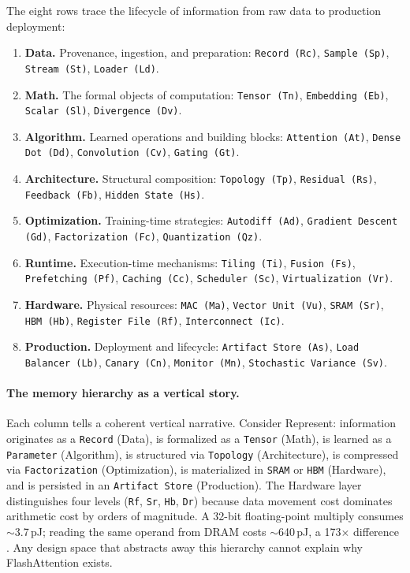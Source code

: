 \documentclass[10pt,twocolumn]{article}
\begin{document}
The eight rows trace the lifecycle of information from raw data to production deployment:

\begin{enumerate}[nosep, leftmargin=*]
\item \textbf{Data.} Provenance, ingestion, and preparation: \texttt{Record (Rc)}, \texttt{Sample (Sp)}, \texttt{Stream (St)}, \texttt{Loader (Ld)}.
\item \textbf{Math.} The formal objects of computation: \texttt{Tensor (Tn)}, \texttt{Embedding (Eb)}, \texttt{Scalar (Sl)}, \texttt{Divergence (Dv)}.
\item \textbf{Algorithm.} Learned operations and building blocks: \texttt{Attention (At)}, \texttt{Dense Dot (Dd)}, \texttt{Convolution (Cv)}, \texttt{Gating (Gt)}.
\item \textbf{Architecture.} Structural composition: \texttt{Topology (Tp)}, \texttt{Residual (Rs)}, \texttt{Feedback (Fb)}, \texttt{Hidden State (Hs)}.
\item \textbf{Optimization.} Training-time strategies: \texttt{Autodiff (Ad)}, \texttt{Gradient Descent (Gd)}, \texttt{Factorization (Fc)}, \texttt{Quantization (Qz)}.
\item \textbf{Runtime.} Execution-time mechanisms: \texttt{Tiling (Ti)}, \texttt{Fusion (Fs)}, \texttt{Prefetching (Pf)}, \texttt{Caching (Cc)}, \texttt{Scheduler (Sc)}, \texttt{Virtualization (Vr)}.
\item \textbf{Hardware.} Physical resources: \texttt{MAC (Ma)}, \texttt{Vector Unit (Vu)}, \texttt{SRAM (Sr)}, \texttt{HBM (Hb)}, \texttt{Register File (Rf)}, \texttt{Interconnect (Ic)}.
\item \textbf{Production.} Deployment and lifecycle: \texttt{Artifact Store (As)}, \texttt{Load Balancer (Lb)}, \texttt{Canary (Cn)}, \texttt{Monitor (Mn)}, \texttt{Stochastic Variance (Sv)}.
\end{enumerate}

\paragraph{The memory hierarchy as a vertical story.} Each column tells a coherent vertical narrative. Consider Represent: information originates as a \texttt{Record} (Data), is formalized as a \texttt{Tensor} (Math), is learned as a \texttt{Parameter} (Algorithm), is structured via \texttt{Topology} (Architecture), is compressed via \texttt{Factorization} (Optimization), is materialized in \texttt{SRAM} or \texttt{HBM} (Hardware), and is persisted in an \texttt{Artifact Store} (Production). The Hardware layer distinguishes four levels (\texttt{Rf}, \texttt{Sr}, \texttt{Hb}, \texttt{Dr}) because data movement cost dominates arithmetic cost by orders of magnitude. A 32-bit floating-point multiply consumes ${\sim}$3.7\,pJ; reading the same operand from DRAM costs ${\sim}$640\,pJ, a 173$\times$ difference \citep{horowitz2014}. Any design space that abstracts away this hierarchy cannot explain why FlashAttention exists.
\end{document}
